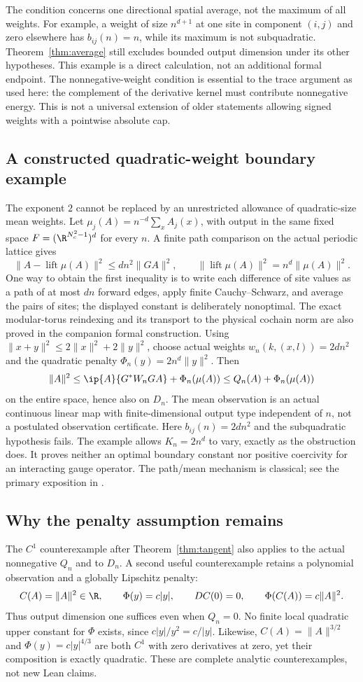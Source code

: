 The condition concerns one directional spatial average, not the maximum
of all weights. For example, a weight of size $n^{d+1}$ at one site in
component $(i,j)$ and zero elsewhere has $b_{ij}(n)=n$, while its maximum
is not subquadratic. Theorem~\ref{thm:average} still excludes bounded
output dimension under its other hypotheses. This example is a direct
calculation, not an additional formal endpoint. The nonnegative-weight
condition is essential to the trace argument as used here: the complement
of the derivative kernel must contribute nonnegative energy. This is not
a universal extension of older statements allowing signed weights with a
pointwise absolute cap.

\subsection{A constructed quadratic-weight boundary example}
The exponent $2$ cannot be replaced by an unrestricted allowance of
quadratic-size mean weights. Let
$\mu_j(A)=n^{-d}\sum_x A_j(x)$, with output in the same fixed space
$F=(\R^{N_c^2-1})^d$ for every $n$. A finite path comparison on the actual
periodic lattice gives
\[
 \|A-\operatorname{lift}\mu(A)\|^2\leq d n^2\|GA\|^2,
 \qquad \|\operatorname{lift}\mu(A)\|^2=n^d\|\mu(A)\|^2.
\]
One way to obtain the first inequality is to write each difference of
site values as a path of at most $dn$ forward edges, apply finite
Cauchy--Schwarz, and average the pairs of sites; the displayed constant
is deliberately nonoptimal. The exact modular-torus reindexing and its
transport to the physical cochain norm are also proved in the companion
formal construction.
Using $\|x+y\|^2\leq2\|x\|^2+2\|y\|^2$, choose actual weights
$w_n(k,(x,l))=2dn^2$ and the quadratic penalty
$\Phi_n(y)=2n^d\|y\|^2$. Then
\[
 \|A\|^2\leq\ip{A}{G^*W_nGA}+\Phi_n(\mu(A))
                  \leq Q_n(A)+\Phi_n(\mu(A))
\]
on the entire space, hence also on $D_n$. The mean observation is an
actual continuous linear map with finite-dimensional output type
independent of $n$, not a postulated observation certificate. Here
$b_{ij}(n)=2dn^2$ and the subquadratic hypothesis fails. The example
allows $K_n=2n^d$ to vary, exactly as the obstruction does. It proves
neither an optimal boundary constant nor positive coercivity for an
interacting gauge operator. The path/mean mechanism is classical;
see the primary exposition in \cite{levin-peres}.

\subsection{Why the penalty assumption remains}
The $C^1$ counterexample after Theorem~\ref{thm:tangent} also applies to
the actual nonnegative $Q_n$ and to $D_n$. A second useful counterexample
retains a polynomial observation and a globally Lipschitz penalty:
\[
 C(A)=\|A\|^2\in\R,\qquad \Phi(y)=c|y|,
 \qquad DC(0)=0,\qquad \Phi(C(A))=c\|A\|^2.
\]
Thus output dimension one suffices even when $Q_n=0$. No finite local
quadratic upper constant for $\Phi$ exists, since $c|y|/y^2=c/|y|$.
Likewise, $C(A)=\|A\|^{3/2}$ and $\Phi(y)=c|y|^{4/3}$ are both $C^1$
with zero derivatives at zero, yet their composition is exactly quadratic.
These are complete analytic counterexamples, not new Lean claims.

